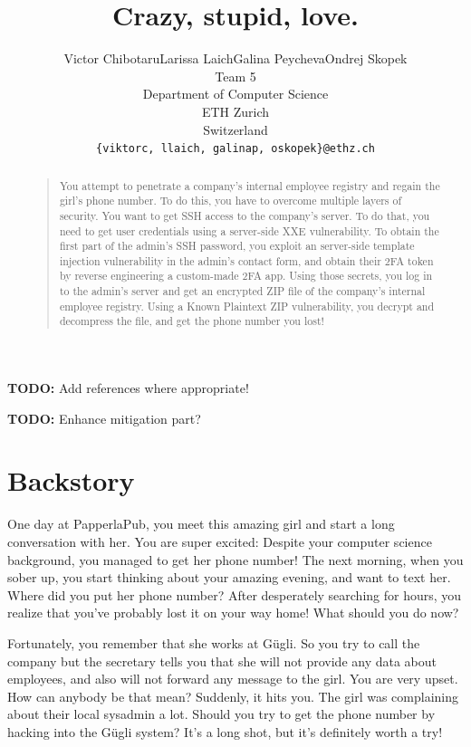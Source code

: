 \documentclass[a4paper]{article}
\newcommand{\TODO}[1]{\begin{center}\large\textbf{TODO:} #1\end{center}}
\begin{document}
\title{Crazy, stupid, love.}
\author{Victor Chibotaru\quad Larissa Laich\quad Galina Peycheva\quad Ondrej Skopek\\
  Team 5\\
  Department of Computer Science\\
  ETH Zurich\\
  Switzerland\\
  \texttt{\{viktorc, llaich, galinap, oskopek\}@ethz.ch}
}
\maketitle
\begin{abstract}
  \begin{quote}
    You attempt to penetrate a company's internal employee registry and
    regain the girl's phone number. To do this, you have to overcome
    multiple layers of security. You want to get SSH access to the company's
    server. To do that, you need to get user credentials using a
    server-side XXE vulnerability.
    To obtain the first part of the admin's SSH password, you
    exploit an server-side template injection vulnerability in the
    admin's contact form, and obtain their 2FA token by
    reverse engineering a custom-made 2FA app.
    Using those secrets, you log in to the admin's server
    and get an encrypted ZIP file of the company's internal employee
    registry. Using a Known Plaintext ZIP vulnerability, you
    decrypt and decompress the file, and get the phone number you lost!
  \end{quote}
\end{abstract}

\TODO{Add references where appropriate!}
\TODO{Enhance mitigation part?}

\section{Backstory}

One day at PapperlaPub, you meet this amazing girl and start a long
conversation with her. You are super excited: Despite your computer
science background, you managed to get her phone number! The next
morning, when you sober up, you start thinking about your amazing
evening, and want to text her. Where did you put her phone number? After
desperately searching for hours, you realize that you've
probably lost it on your way home! What should you do now?

Fortunately, you remember that she works at Gügli. So you try to call
the company but the secretary tells you that she will not provide any
data about employees, and also will not forward any message to the girl.
You are very upset. How can anybody be that mean? Suddenly, it hits you.
The girl was complaining about their local sysadmin a lot. Should you
try to get the phone number by hacking into the Gügli system? It's a
long shot, but it's definitely worth a try!
\end{document}
